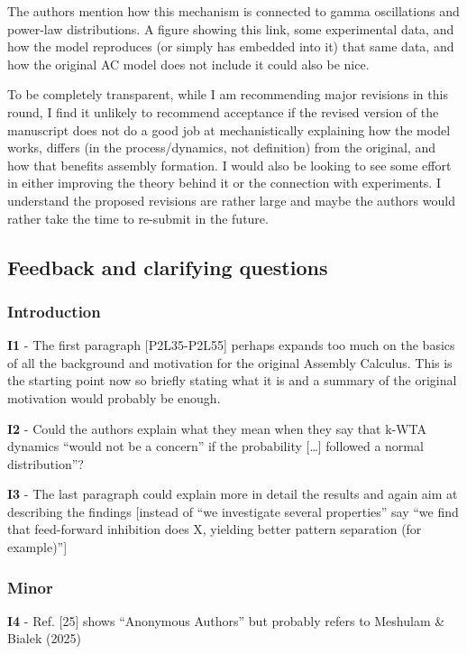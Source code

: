 \documentclass[a4paper, 11pt]{article}
\begin{document}
The authors mention how this mechanism is connected to gamma oscillations and power-law distributions. A figure showing this link, some experimental data, and how the model reproduces (or simply has embedded into it) that same data, and how the original AC model does not include it could also be nice.

To be completely transparent, while I am recommending major revisions in this round, I find it unlikely to recommend acceptance if the revised version of the manuscript does not do a good job at mechanistically explaining how the model works, differs (in the process/dynamics, not definition) from the original, and how that benefits assembly formation. I would also be looking to see some effort in either improving the theory behind it or the connection with experiments. I understand the proposed revisions are rather large and maybe the authors would rather take the time to re-submit in the future.

\subsection*{Feedback and clarifying questions}

\subsubsection*{Introduction}
\textbf{I1} - The first paragraph [P2L35-P2L55] perhaps expands too much on the basics of all the background and motivation for the original Assembly Calculus. This is the starting point now so briefly stating what it is and a summary of the original motivation would probably be enough.

\textbf{I2} - Could the authors explain what they mean when they say that k-WTA dynamics ``would not be a concern'' if the probability [\dots] followed a normal distribution''?

\textbf{I3} - The last paragraph could explain more in detail the results and again aim at describing the findings [instead of ``we investigate several properties'' say ``we find that feed-forward inhibition does X, yielding better pattern separation (for example)'']

\subsubsection*{Minor}
\textbf{I4} - Ref. [25] shows ``Anonymous Authors'' but probably refers to Meshulam \& Bialek (2025)
\end{document}
